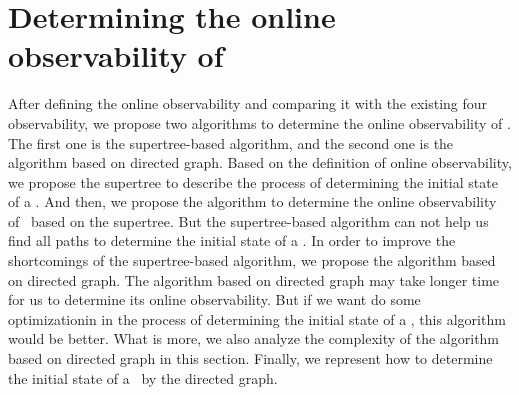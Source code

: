 \section{Determining the online observability of \BCNs}
\label{sec:deter}
After defining the online observability and comparing it with the existing four observability, we propose two algorithms to determine the online observability of \BCNs. The first one is the supertree-based algorithm, and the second one is the algorithm based on directed graph. Based on the definition of online observability, we propose the supertree to describe the process of determining the initial state of a \BCN. And then, we propose the algorithm to determine the online observability of \BCNs\ based on the supertree. But the supertree-based algorithm can not help us find all paths to determine the initial state of a \BCN. In order to improve the shortcomings of the supertree-based algorithm, we propose the algorithm based on directed graph. The algorithm based on directed graph may take longer time for us to determine its online observability. But if we want do some optimizationin in the process of determining the initial state of a \BCN, this algorithm would be better. What is more, we also analyze the complexity of the algorithm based on directed graph in this section. Finally, we represent how to determine the initial state of a \BCN\ by the directed graph.

